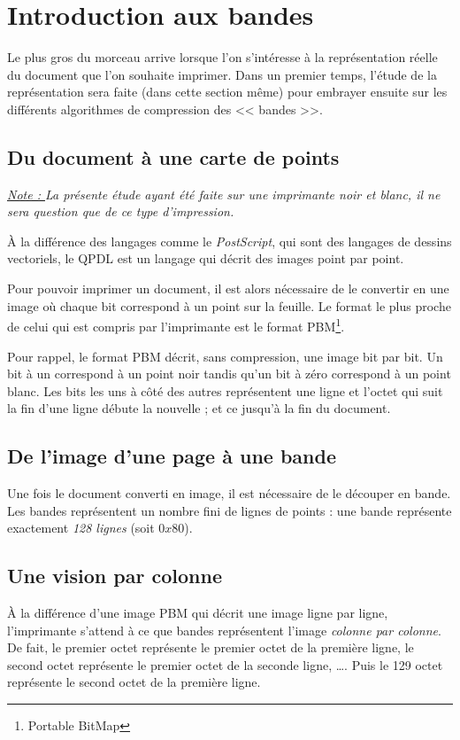 \section{Introduction aux bandes}
Le plus gros du morceau arrive lorsque l'on s'intéresse à la représentation
réelle du document que l'on souhaite imprimer. Dans un premier temps,
l'étude de la représentation sera faite (dans cette section même) pour
embrayer ensuite sur les différents algorithmes de compression des
<< bandes >>.

\subsection{Du document à une carte de points}

\noindent\textit{\underline{Note : }La présente étude ayant été faite sur une
imprimante noir et blanc, il ne sera question que de ce type d'impression.}
\medskip

À la différence des langages comme le \emph{PostScript}, qui sont des langages
de dessins vectoriels, le QPDL est un langage qui décrit des images point
par point.

Pour pouvoir imprimer un document, il est alors nécessaire de le convertir
en une image où chaque bit correspond à un point sur la feuille. Le format
le plus proche de celui qui est compris par l'imprimante est le format
PBM\footnote{Portable BitMap}.

Pour rappel, le format PBM décrit, sans compression, une image bit par bit.
Un bit à un correspond à un point noir tandis qu'un bit à zéro correspond à
un point blanc. Les bits les uns à côté des autres représentent une ligne et
l'octet qui suit la fin d'une ligne débute la nouvelle ; et ce jusqu'à la fin
du document.

\subsection{De l'image d'une page à une bande}

Une fois le document converti en image, il est nécessaire de le découper en
bande. Les bandes représentent un nombre fini de lignes de points : une bande
représente exactement \emph{128 lignes} (soit $0x80$).

\subsection{Une vision par colonne}

À la différence d'une image PBM qui décrit une image ligne par ligne,
l'imprimante s'attend à ce que bandes représentent l'image \emph{colonne
par colonne}. De fait, le premier octet représente le premier octet de la
première ligne, le second octet représente le premier octet de la seconde
ligne, \ldots. Puis le 129\ieme{} octet représente le second octet de la
première ligne.

